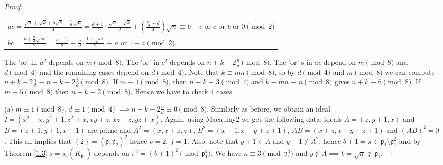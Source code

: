 \documentclass[10pt,a4paper]{amsart}
\begin{document}
\begin{proof}
\begin{center}
\begin{tabular}{@{}l@{}}
$ac = \frac{\sqrt{n} + \sqrt{k} + d\sqrt{k} + \frac{m}{d} \sqrt{n} }{4} =  \frac{d+1}{2} \cdot \frac{\sqrt{n}+\sqrt{k}}{2} + (\frac{\frac{m}{d}-d}{4})\sqrt{n} \equiv b+c \text{ or } c \text{ or } b \text{ or } 0 \pmod{2}$\\
$bc = \frac{n + \frac{n}{d}\sqrt{m}}{2} = \frac{n - \frac{n}{d}}{2} + \frac{n}{d} \cdot \frac{1+ \sqrt{m}}{2} \equiv a \text{ or }  1 + a \pmod{2}.$
\end{tabular}
\end{center}
The 'or' in $a^2$ depends on $m \pmod{8}$. The 'or' in $c^2$ depends on $n+k-2\frac{n}{d} \pmod{8}$. The 'or'-s in $ac$ depend on $m \pmod{8}$ and $d \pmod{4}$ and the remaining cases depend on $d \pmod{4}$. Note that $k \equiv mn \pmod{8}$, so by $d \pmod{4}$ and $m \pmod{8}$ we can compute $n+k-2\frac{n}{d} \equiv n+k-2\frac{3}{d} \pmod{8}$. If $m\equiv 1\pmod{8}$, then $n \equiv k \equiv 3 \pmod{4}$ and $k \equiv mn \equiv n \pmod{8}$ gives $n+k \equiv 6 \pmod{8}$. If $m \equiv 5 \pmod{8}$ then $n+k \equiv 2 \pmod{8}$. Hence we have to check 4 cases.


(a) $m \equiv 1 \pmod{8}$, $d \equiv 1 \pmod{4}$ $ \implies n+k-2\frac{n}{d} \equiv 0 \pmod{8}$. Similarly as before, we obtain an ideal $I = (x^2+x,y^2+1,z^2+x,xy+z,xz+z,yz+x)$. Again, using Macaulay2 we get the following data: ideals $A = (z,y+1,x)$ and $B = (z+1,y+1,x+1)$ are prime and $A^2 = (x,x+z,z)$, $B^2 = (x+1,x+y+z+1)$, $AB = (x+z,x+y+z+1)$ and $(AB)^2 = 0$. This all implies that $(2)=(\mathfrak{p}_1\mathfrak{p}_2)^2$ hence $ e=2, \ f=1$. Also, note that $y+1 \in A$ and $y+1 \not\in A^2$, hence $b+1 = \pi \in \mathfrak{p}_1 \setminus \mathfrak{p}_1^2$ and by Theorem \ref{1.3} $s = s_4(K_{\mathfrak{p}_1})$ depends on $\pi^2 = (b+1)^2 \pmod{\mathfrak{p}_1^4}$. We have $n \equiv 3 \pmod{\mathfrak{p}_1^4}$ and $y \not\in A \implies b = \sqrt{n} \not\in \mathfrak{p}_1$. 


\end{proof}
\end{document}
